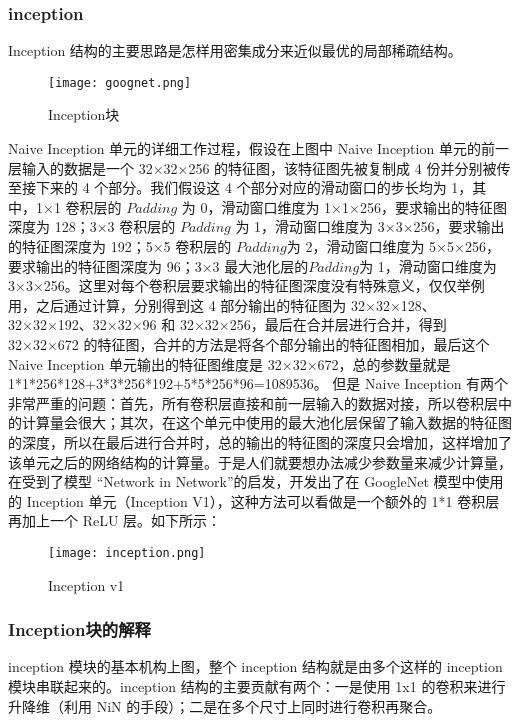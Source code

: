 \subsubsection{inception}
Inception 结构的主要思路是怎样用密集成分来近似最优的局部稀疏结构。\\
\begin{figure}[!h]
	\centering
	\texttt{[image: goognet.png]}
	\caption{Inception块}
	\label{fig:circuitm1}
\end{figure} \par
Naive Inception 单元的详细工作过程，假设在上图中 Naive Inception 单元的前一层输入的数据是一个 32×32×256 的特征图，该特征图先被复制成 4 份并分别被传至接下来的 4 个部分。我们假设这 4 个部分对应的滑动窗口的步长均为 1，其中，1×1 卷积层的 $Padding$ 为 0，滑动窗口维度为 1×1×256，要求输出的特征图深度为 128；3×3 卷积层的 $Padding$ 为 1，滑动窗口维度为 3×3×256，要求输出的特征图深度为 192；5×5 卷积层的 $Padding$为 2，滑动窗口维度为 5×5×256，要求输出的特征图深度为 96；3×3 最大池化层的$Padding$为 1，滑动窗口维度为 3×3×256。这里对每个卷积层要求输出的特征图深度没有特殊意义，仅仅举例用，之后通过计算，分别得到这 4 部分输出的特征图为 32×32×128、32×32×192、32×32×96 和 32×32×256，最后在合并层进行合并，得到 32×32×672 的特征图，合并的方法是将各个部分输出的特征图相加，最后这个 Naive Inception 单元输出的特征图维度是 32×32×672，总的参数量就是 1*1*256*128+3*3*256*192+5*5*256*96=1089536。 
但是 Naive Inception 有两个非常严重的问题：首先，所有卷积层直接和前一层输入的数据对接，所以卷积层中的计算量会很大；其次，在这个单元中使用的最大池化层保留了输入数据的特征图的深度，所以在最后进行合并时，总的输出的特征图的深度只会增加，这样增加了该单元之后的网络结构的计算量。于是人们就要想办法减少参数量来减少计算量，在受到了模型 “Network in Network”的启发，开发出了在 GoogleNet 模型中使用的 Inception 单元（Inception V1），这种方法可以看做是一个额外的 1*1 卷积层再加上一个 ReLU 层。如下所示： 
\begin{figure}[!h]
	\centering
	\texttt{[image: inception.png]}
	\caption{Inception v1}
	\label{fig:circuitm1}
\end{figure} \par
\subsubsection{Inception块的解释}
    inception 模块的基本机构上图，整个 inception 结构就是由多个这样的 inception 模块串联起来的。inception 结构的主要贡献有两个：一是使用 1x1 的卷积来进行升降维（利用 NiN 的手段）；二是在多个尺寸上同时进行卷积再聚合。

